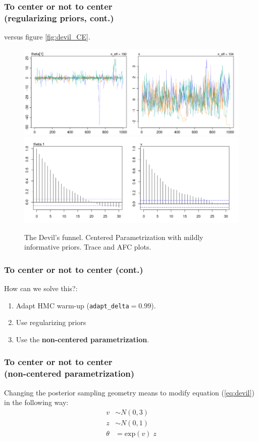 \documentclass[nonav,sleutel]{beamer}
\begin{document}
	\begin{frame}
		\frametitle{To center or not to center \\
			(regularizing priors, cont.)}
		versus figure \ref{fig:devil_CE}.
		\begin{figure}[h] 
			\centering
			\includegraphics[width=.60\linewidth]{2_trace_CE_priors}
			\includegraphics[width=.63\linewidth]{2_acf_CE_priors}
			\caption{The Devil's funnel. Centered Parametrization with mildly informative priors. Trace and AFC plots.}
			\label{fig:devil_prior}
		\end{figure}
	\end{frame}
	\begin{frame}
		\frametitle{To center or not to center (cont.)}
		How can we solve this?:
		\begin{enumerate}
			\item Adapt HMC warm-up (\texttt{adapt\_delta}$=0.99$).
			\item Use regularizing priors
			\item Use the \textbf{non-centered parametrization}.
		\end{enumerate}
	\end{frame}
	\begin{frame}
		\frametitle{To center or not to center \\
			(non-centered parametrization)}
		Changing the posterior sampling geometry means to modify equation (\ref{eq:devil}) in the following way:
		\begin{equation} \label{eq:devil_NC}
			\begin{split}	
				v &\sim N(0, 3) \\
				z &\sim N(0, 1) \\
				\theta &= \text{exp}(v) \; z
			\end{split}
		\end{equation}
	\end{frame}
\end{document}
